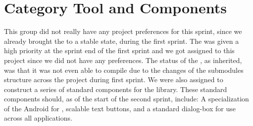 \section{Category Tool and Components}

This group did not really have any project preferences for this sprint, since we already brought the \launcher to a stable state, during the first sprint. The \giraf \ct was given a high priority at the sprint end of the first sprint and we got assigned to this project since we did not have any preferences. The status of the \ct, as inherited, was that it was not even able to compile due to the changes of the submodules structure across the project during first sprint. We were also assigned to construct a series of standard components for the  library. These standard components should, as of the start of the second sprint, include: A specialization of the Android  for \giraf, scalable text buttons, and a standard dialog-box for use across all applications. 
